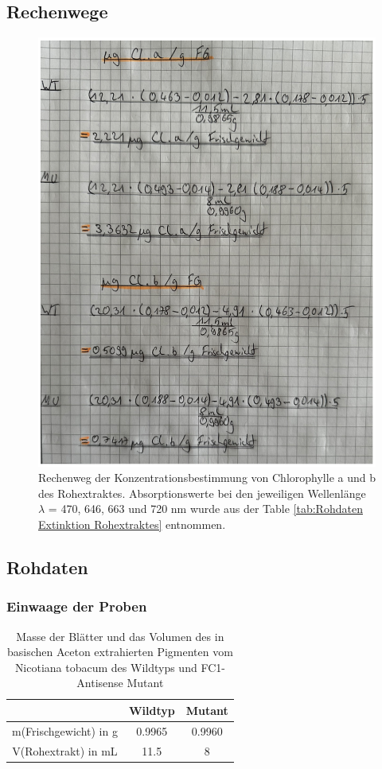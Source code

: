 \documentclass[10pt,a4paper]{article}
\begin{document}
		\subsection{Rechenwege}
			\begin{figure}[H]
				\centering
				\includegraphics[scale=0.8]{Rechenweg_frido}
				\caption{Rechenweg der Konzentrationsbestimmung von Chlorophylle a und b des Rohextraktes. Absorptionswerte bei den jeweiligen Wellenlänge $\lambda$ = 470, 646, 663 und 720 nm wurde aus der Table \ref{tab:Rohdaten Extinktion Rohextraktes} entnommen.}
				\label{fig:Konzentrationsbestimmungrechenweg}
			\end{figure}
		\subsection{Rohdaten}
			\subsubsection{Einwaage der Proben }
				\begin{table}[H]
					\centering
					\caption{Masse der Blätter und das Volumen des in basischen Aceton extrahierten Pigmenten vom Nicotiana tobacum des Wildtyps und FC1-Antisense Mutant}
					\label{tab:Probemassen und Volumen}
					\begin{tabular}{ccc}
						\toprule
						&Wildtyp& Mutant\\
						\midrule
						m(Frischgewicht) in g & 0.9965 & 0.9960\\
						V(Rohextrakt) in mL & 11.5 & 8\\
						\bottomrule
					\end{tabular}
				\end{table}
				
\end{document}
